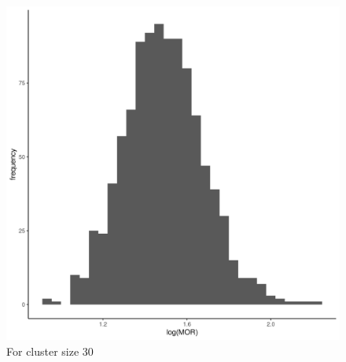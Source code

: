 \documentclass[
  letterpaper,
  DIV=11,
  numbers=noendperiod,
  titlepage]{scrartcl}
\begin{document}
\begin{figure}
\begin{minipage}[t]{0.50\linewidth}
{{\includegraphics{../../plots/two-lvl-ran-int/high-prev/hist_50_30_two_lvl_high_prev.png}

}

\caption{For cluster size 30}

}

\end{minipage}%
%
\begin{minipage}[t]{0.50\linewidth}

{\centering 

}
\end{minipage}
\end{figure}
\end{document}
